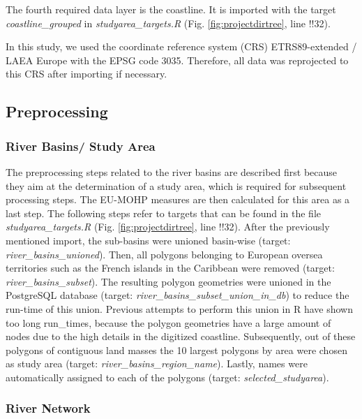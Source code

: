 \documentclass[fleqn,10pt]{wlscirep}
\begin{document}
The fourth required data layer is the coastline. It is imported with the target \emph{coastline\_grouped} in \emph{studyarea\_targets.R} (Fig. \ref{fig:projectdirtree}, line !!32).

In this study, we used the coordinate reference system (CRS) ETRS89-extended / LAEA Europe with the EPSG code 3035. Therefore, all data was reprojected to this CRS after importing if necessary.

\hypertarget{preprocessing}{%
\subsection{Preprocessing}\label{preprocessing}}

\hypertarget{river-basins-study-area}{%
\subsubsection*{River Basins/ Study Area}\label{river-basins-study-area}}

The preprocessing steps related to the river basins are described first because they aim at the determination of a study area, which is required for subsequent processing steps. The EU-MOHP measures are then calculated for this area as a last step. The following steps refer to targets that can be found in the file \emph{studyarea\_targets.R} (Fig. \ref{fig:projectdirtree}, line !!32). After the previously mentioned import, the sub-basins were unioned basin-wise (target: \emph{river\_basins\_unioned}). Then, all polygons belonging to European oversea territories such as the French islands in the Caribbean were removed (target: \emph{river\_basins\_subset}). The resulting polygon geometries were unioned in the PostgreSQL database (target: \emph{river\_basins\_subset\_union\_in\_db}) to reduce the run-time of this union. Previous attempts to perform this union in R have shown too long run\_times, because the polygon geometries have a large amount of nodes due to the high details in the digitized coastline. Subsequently, out of these polygons of contiguous land masses the 10 largest polygons by area were chosen as study area (target: \emph{river\_basins\_region\_name}). Lastly, names were automatically assigned to each of the polygons (target: \emph{selected\_studyarea}).

\hypertarget{river-network}{%
\subsubsection*{River Network}\label{river-network}}
\end{document}
